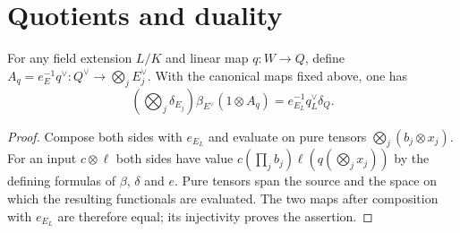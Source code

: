 \section{Quotients and duality}

\begin{lemma}
\label{lem:dual-inclusion-base-change}
\leanok
For any field extension $L/K$ and linear map $q:W\to Q$, define
$A_q=e_E^{-1}q^\vee:Q^\vee\to\bigotimes_jE_j^\vee$.
With the canonical maps fixed above, one has
\[
 \left(\bigotimes_j\delta_{E_j}\right)\beta_{E^\vee}(1\otimes A_q)
   =e_{E_L}^{-1}q_L^\vee\delta_Q.
\]
\end{lemma}
\begin{proof}
Compose both sides with $e_{E_L}$ and evaluate on pure tensors
$\bigotimes_j(b_j\otimes x_j)$. For an input $c\otimes\ell$ both sides
have value
$c(\prod_j b_j)\ell(q(\bigotimes_jx_j))$ by the defining formulas of
$\beta$, $\delta$ and $e$. Pure tensors span the source and the space on
which the resulting functionals are evaluated. The two maps after composition
with $e_{E_L}$ are therefore equal; its injectivity proves the assertion.
\end{proof}

